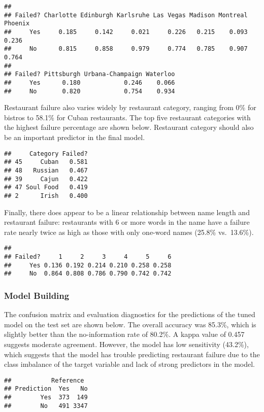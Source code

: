 \documentclass[]{article}
\begin{document}
\begin{verbatim}
##        
## Failed? Charlotte Edinburgh Karlsruhe Las Vegas Madison Montreal Phoenix
##     Yes     0.185     0.142     0.021     0.226   0.215    0.093   0.236
##     No      0.815     0.858     0.979     0.774   0.785    0.907   0.764
##        
## Failed? Pittsburgh Urbana-Champaign Waterloo
##     Yes      0.180            0.246    0.066
##     No       0.820            0.754    0.934
\end{verbatim}

Restaurant failure also varies widely by restaurant category, ranging
from 0\% for bistros to 58.1\% for Cuban restaurants. The top five
restaurant categories with the highest failure percentage are shown
below. Restaurant category should also be an important predictor in the
final model.

\begin{verbatim}
##     Category Failed?
## 45     Cuban   0.581
## 48   Russian   0.467
## 39     Cajun   0.422
## 47 Soul Food   0.419
## 2      Irish   0.400
\end{verbatim}

Finally, there does appear to be a linear relationship between name
length and restaurant failure: restaurants with 6 or more words in the
name have a failure rate nearly twice as high as those with only
one-word names (25.8\% vs.~13.6\%).

\begin{verbatim}
##        
## Failed?     1     2     3     4     5     6
##     Yes 0.136 0.192 0.214 0.210 0.258 0.258
##     No  0.864 0.808 0.786 0.790 0.742 0.742
\end{verbatim}

\subsubsection{Model Building}\label{model-building}

The confusion matrix and evaluation diagnostics for the predictions of
the tuned model on the test set are shown below. The overall accuracy
was 85.3\%, which is slightly better than the no-information rate of
80.2\%. A kappa value of 0.457 suggests moderate agreement. However, the
model has low sensitivity (43.2\%), which suggests that the model has
trouble predicting restaurant failure due to the class imbalance of the
target variable and lack of strong predictors in the model.

\begin{verbatim}
##           Reference
## Prediction  Yes   No
##        Yes  373  149
##        No   491 3347
\end{verbatim}
\end{document}
